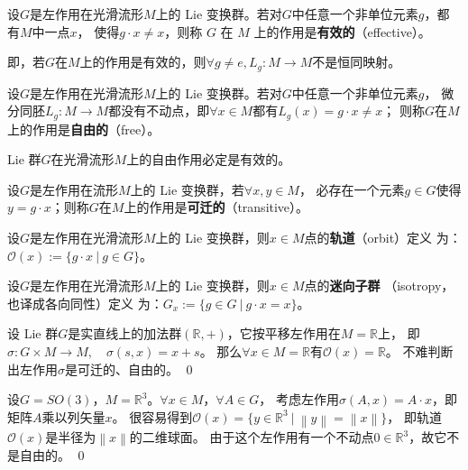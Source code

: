 \begin{definition}
    设$G$是左作用在光滑流形$M$上的 Lie 变换群。若对$G$中任意一个非单位元素$g$，都有$M$中一点$x$，
    使得$g \cdot x \neq x$，则称 $G$ 在 $M$ 上的作用是\textbf{有效的}（effective）。
\end{definition}

即，若$G$在$M$上的作用是有效的，则$\forall g \neq e, L_{g}: M \rightarrow M$不是恒同映射。

\begin{definition}
    设$G$是左作用在光滑流形$M$上的 Lie 变换群。若对$G$中任意一个非单位元素$g$，
    微分同胚$L_g: M \rightarrow M$都没有不动点，即$\forall x \in M$都有$L_g(x)=g \cdot x \neq x$；
    则称$G$在$M$上的作用是\textbf{自由的}（free）。
\end{definition}

 Lie 群$G$在光滑流形$M$上的自由作用必定是有效的。

\begin{definition}
    设$G$是左作用在流形$M$上的 Lie 变换群，若$\forall x, y \in M$，
    必存在一个元素$g \in G$使得$y=g \cdot x$；则称$G$在$M$上的作用是\textbf{可迁的}（transitive）。
\end{definition}

\begin{definition}
    设$G$是左作用在光滑流形$M$上的 Lie 变换群，则$x \in M$点的\textbf{轨道}（orbit）定义
    为：$\mathcal{O}(x) := \{ g\cdot x \ | \  g\in G \}$。
\end{definition}

\begin{definition}
    设$G$是左作用在光滑流形$M$上的 Lie 变换群，则$x \in M$点的\textbf{迷向子群}
    （isotropy，也译成{各向同性}）定义
    为：$G_x := \{ g\in G \ | \  g\cdot x = x \}$。
\end{definition}

\begin{example}
    设 Lie 群$G$是实直线上的加法群$(\mathbb{R},+)$，它按平移左作用在$M=\mathbb{R}$上，
    即$\sigma: G\times M \to M,\quad \sigma(s,x)=x+s$。
    那么$\forall x\in M= \mathbb{R}$有$\mathcal{O}(x)=\mathbb{R}$。
    不难判断出左作用$\sigma$是可迁的、自由的。 \qed
\end{example}

\begin{example}
    设$G=SO(3)$，$M=\mathbb{R}^3$。$\forall x\in M$，$\forall A\in G$，
    考虑左作用$\sigma(A,x)=A\cdot x$，即矩阵$A$乘以列矢量$x$。
    很容易得到$\mathcal{O}(x)=\{y\in \mathbb{R}^3 \ |\   \left\|y\right\|=\left\|x\right\| \}$，
    即轨道$\mathcal{O}(x)$是半径为$\left\|x\right\|$的二维球面。
    由于这个左作用有一个不动点$0\in \mathbb{R}^3$，故它不是自由的。 \qed
\end{example}

